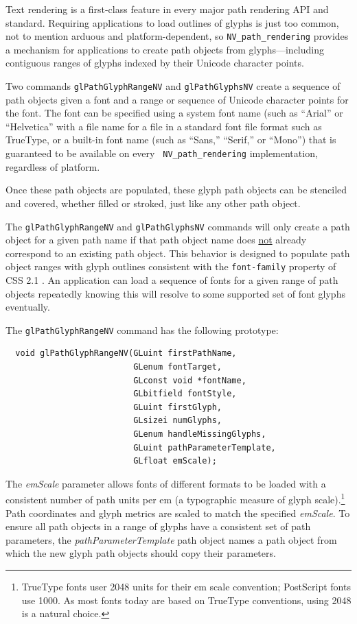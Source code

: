 Text rendering is a first-class feature in every major path rendering
API and standard.  Requiring applications to load outlines of glyphs
is just too common, not to mention arduous and platform-dependent,
so {\tt NV\_path\_rendering} provides a mechanism for applications to
create path objects from glyphs---including contiguous ranges of glyphs
indexed by their Unicode character points.

Two commands {\tt glPathGlyphRangeNV} and {\tt glPathGlyphsNV} create a sequence of path
objects given a font and a range or sequence of Unicode character points
for the font.  The font can be specified using a system font name (such as
``Arial'' or ``Helvetica'' with a file name for a file in a standard font
file format such as TrueType, or a built-in font name (such as ``Sans,''
``Serif,'' or ``Mono'') that is guaranteed to be available on every {\tt
NV\_path\_rendering} implementation, regardless of platform.

Once these path objects are populated, these glyph path objects can be
stenciled and covered, whether filled or stroked, just like any other
path object.

The {\tt glPathGlyphRangeNV} and {\tt glPathGlyphsNV} commands will only
create a path object for a given path name if that path object name
does \underline{not} already correspond to an existing path object.
This behavior is designed to populate path object ranges with glyph
outlines consistent with the {\tt font-family} property of CSS 2.1
\cite{CSS-Spec}.  An application can load a sequence of fonts for a
given range of path objects repeatedly knowing this will resolve to some
supported set of font glyphs eventually.

The {\tt glPathGlyphRangeNV} command has the following prototype:
\begin{lstlisting}
  void glPathGlyphRangeNV(GLuint firstPathName,
                          GLenum fontTarget,
                          GLconst void *fontName,
                          GLbitfield fontStyle,
                          GLuint firstGlyph,
                          GLsizei numGlyphs,
                          GLenum handleMissingGlyphs,
                          GLuint pathParameterTemplate,
                          GLfloat emScale);
\end{lstlisting}
The {\em emScale} parameter allows fonts of different formats to be loaded
with a consistent number of path units per em (a typographic measure of
glyph scale).\footnote{TrueType fonts user 2048 units for their em scale convention; PostScript fonts use 1000.  As most fonts today are based on TrueType conventions, using 2048 is a natural choice.}  Path coordinates and glyph metrics are scaled to match
the specified {\em emScale}.  To ensure all path objects in a range of glyphs
have a consistent set of path parameters, the {\em pathParameterTemplate} path
object names a path object from which the new glyph path objects should
copy their parameters.

